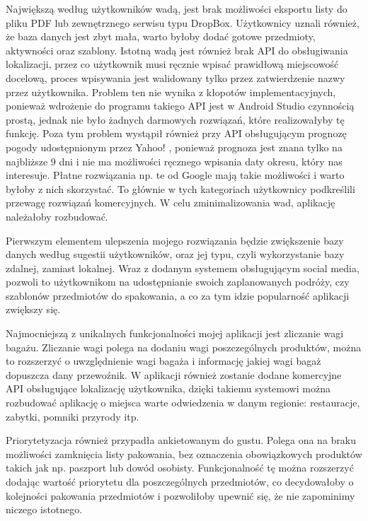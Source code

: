\documentclass[a4paper,12pt]{article}
\begin{document}
Największą według użytkowników wadą, jest brak możliwości eksportu listy do pliku PDF lub zewnętrznego serwisu typu DropBox. Użytkownicy uznali również, że baza danych jest zbyt mała, warto byłoby dodać gotowe przedmioty, aktywności oraz szablony. Istotną wadą jest również brak API do obsługiwania lokalizacji, przez co użytkownik musi ręcznie wpisać prawidłową miejscowość docelową, proces wpisywania jest walidowany tylko przez zatwierdzenie nazwy przez użytkownika. Problem ten nie wynika z kłopotów implementacyjnych, ponieważ wdrożenie do programu takiego API jest w Android Studio czynnością prostą, jednak nie było żadnych darmowych rozwiązań, które realizowałyby tę funkcję. Poza tym problem wystąpił również przy API obsługującym prognozę pogody udostępnionym przez Yahoo! \cite{yahoo}, ponieważ prognoza jest znana tylko na najbliższe 9 dni i nie ma możliwości ręcznego wpisania daty okresu, który nas interesuje. Płatne rozwiązania np. te od Google mają takie możliwości i warto byłoby z nich skorzystać. To głównie w tych kategoriach użytkownicy podkreślili przewagę rozwiązań komercyjnych. W celu zminimalizowania wad, aplikację należałoby rozbudować.

Pierwszym elementem ulepszenia mojego rozwiązania będzie zwiększenie bazy danych według sugestii użytkowników, oraz jej typu, czyli wykorzystanie bazy zdalnej, zamiast lokalnej. Wraz z dodanym systemem obsługującym social media, pozwoli to użytkownikom na udostępnianie swoich zaplanowanych podróży, czy szablonów przedmiotów do spakowania, a co za tym idzie popularność aplikacji zwiększy się.

Najmocniejszą z unikalnych funkcjonalności mojej aplikacji jest zliczanie wagi bagażu. Zliczanie wagi polega na dodaniu wagi poszczególnych produktów, można to rozszerzyć o uwzględnienie wagi bagaża i informację jakiej wagi bagaż dopuszcza dany przewoźnik. W aplikacji również zostanie dodane komercyjne API obsługujące lokalizację użytkownika, dzięki takiemu systemowi można rozbudować aplikację o miejsca warte odwiedzenia w danym regionie: restauracje, zabytki, pomniki przyrody itp.

Priorytetyzacja również przypadła ankietowanym do gustu. Polega ona na braku możliwości zamknięcia listy pakowania, bez oznaczenia obowiązkowych produktów takich jak np. paszport lub dowód osobisty. Funkcjonalność tę można rozszerzyć dodając wartość priorytetu dla poszczególnych przedmiotów, co decydowałoby o kolejności pakowania przedmiotów i pozwoliłoby upewnić się, że nie zapominimy niczego istotnego.
\end{document}
